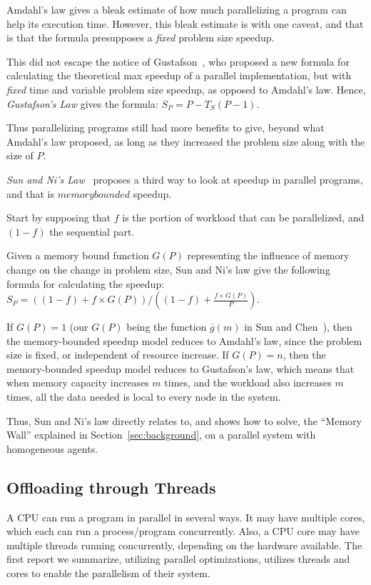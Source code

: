Amdahl's law gives a bleak estimate of how much parallelizing a program can help its execution time.
However, this bleak estimate is with one caveat, and that is that the formula presupposes a \textit{fixed} problem size speedup.

This did not escape the notice of Gustafson~\cite{Gustafson:1988:RAL:42411.42415}, who proposed a new formula for calculating the theoretical max speedup of a parallel implementation, but with \textit{fixed} time and variable problem size speedup, as opposed to Amdahl's law.
Hence, \textit{Gustafson's Law} gives the formula: $S_P = P - T_S(P-1)$.

Thus parallelizing programs still had more benefits to give, beyond what Amdahl's law proposed, as long as they increased the problem size along with the size of $P$.

\textit{Sun and Ni's Law}~\cite{Sun:1990:VPS:110382.110450,Sun2010183} proposes a third way to look at speedup in parallel programs, and that is $memory bounded$ speedup.

Start by supposing that $f$ is the portion of workload that can be parallelized, and $(1-f)$ the sequential part.

Given a memory bound function $G(P)$ representing the influence of memory change on the change in problem size, Sun and Ni's law give the following formula for calculating the speedup: $S_P = ((1-f)+f\times G(P))/((1-f)+\frac{f\times G(P)}{P})$.

If $G(P)=1$ (our $G(P)$ being the function $\overline{g}(m)$ in Sun and Chen~\cite{Sun2010183}), then the memory-bounded speedup model reduces to Amdahl's law, since the problem size is fixed, or independent of resource increase.
If $G(P)=n$, then the memory-bounded speedup model reduces to Gustafson's law, which means that when memory capacity increases $m$ times, and the workload also increases $m$ times, all the data needed is local to every node in the system.

Thus, Sun and Ni's law directly relates to, and shows how to solve, the ``Memory Wall'' explained in Section~\ref{sec:background}, on a parallel system with homogeneous agents.

\subsection{Offloading through Threads}

A CPU can run a program in parallel in several ways.
It may have multiple cores, which each can run a process/program concurrently.
Also, a CPU core may have multiple threads running concurrently, depending on the hardware available.
The first report we summarize, utilizing parallel optimizations, utilizes threads and cores to enable the parallelism of their system.

